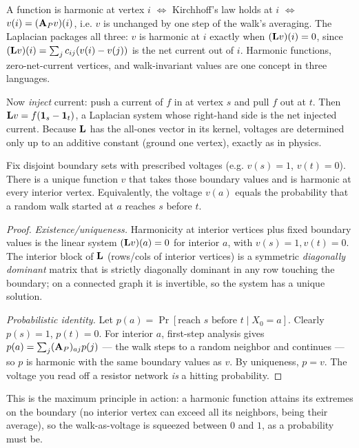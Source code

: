 \begin{whybox}
A function is harmonic at vertex $i$ $\iff$ Kirchhoff's law holds at $i$ $\iff$ $v(i)=(\mathbf{A}_P v)(i)$, i.e. $v$ is unchanged by one step of the walk's averaging. The Laplacian packages all three: $v$ is harmonic at $i$ exactly when $(\mathbf{L} v)(i)=0$, since $(\mathbf{L} v)(i)=\sum_j c_{ij}(v(i)-v(j))$ is the net current out of $i$. Harmonic functions, zero-net-current vertices, and walk-invariant values are one concept in three languages.
\end{whybox}

Now \emph{inject} current: push a current of $f$ in at vertex $s$ and pull $f$ out at $t$. Then $\mathbf{L} v=f(\mathbf{1}_s-\mathbf{1}_t)$, a Laplacian system whose right-hand side is the net injected current. Because $\mathbf{L}$ has the all-ones vector in its kernel, voltages are determined only up to an additive constant (ground one vertex), exactly as in physics.

\begin{theorem}\label{ch35:thm-dirichlet}
Fix disjoint boundary sets with prescribed voltages (e.g. $v(s)=1$, $v(t)=0$). There is a unique function $v$ that takes those boundary values and is harmonic at every interior vertex. Equivalently, the voltage $v(a)$ equals the probability that a random walk started at $a$ reaches $s$ before $t$.
\end{theorem}

\begin{proof}
\emph{Existence/uniqueness.} Harmonicity at interior vertices plus fixed boundary values is the linear system $(\mathbf{L} v)(a)=0$ for interior $a$, with $v(s)=1,v(t)=0$. The interior block of $\mathbf{L}$ (rows/cols of interior vertices) is a symmetric \emph{diagonally dominant} matrix that is strictly diagonally dominant in any row touching the boundary; on a connected graph it is invertible, so the system has a unique solution.

\emph{Probabilistic identity.} Let $p(a)=\Pr[\text{reach }s\text{ before }t\mid X_0=a]$. Clearly $p(s)=1$, $p(t)=0$. For interior $a$, first-step analysis gives $p(a)=\sum_j(\mathbf{A}_P)_{aj}p(j)$ --- the walk steps to a random neighbor and continues --- so $p$ is harmonic with the same boundary values as $v$. By uniqueness, $p=v$. The voltage you read off a resistor network \emph{is} a hitting probability.
\end{proof}

This is the maximum principle in action: a harmonic function attains its extremes on the boundary (no interior vertex can exceed all its neighbors, being their average), so the walk-as-voltage is squeezed between $0$ and $1$, as a probability must be.

